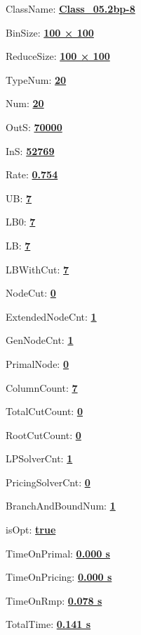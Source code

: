 \documentclass[11pt]{article}
\begin{document}
\pagestyle{empty}


ClassName: \underline{\textbf{Class_05.2bp-8}}
\par
BinSize: \underline{\textbf{100 × 100}}
\par
ReduceSize: \underline{\textbf{100 × 100}}
\par
TypeNum: \underline{\textbf{20}}
\par
Num: \underline{\textbf{20}}
\par
OutS: \underline{\textbf{70000}}
\par
InS: \underline{\textbf{52769}}
\par
Rate: \underline{\textbf{0.754}}
\par
UB: \underline{\textbf{7}}
\par
LB0: \underline{\textbf{7}}
\par
LB: \underline{\textbf{7}}
\par
LBWithCut: \underline{\textbf{7}}
\par
NodeCut: \underline{\textbf{0}}
\par
ExtendedNodeCnt: \underline{\textbf{1}}
\par
GenNodeCnt: \underline{\textbf{1}}
\par
PrimalNode: \underline{\textbf{0}}
\par
ColumnCount: \underline{\textbf{7}}
\par
TotalCutCount: \underline{\textbf{0}}
\par
RootCutCount: \underline{\textbf{0}}
\par
LPSolverCnt: \underline{\textbf{1}}
\par
PricingSolverCnt: \underline{\textbf{0}}
\par
BranchAndBoundNum: \underline{\textbf{1}}
\par
isOpt: \underline{\textbf{true}}
\par
TimeOnPrimal: \underline{\textbf{0.000 s}}
\par
TimeOnPricing: \underline{\textbf{0.000 s}}
\par
TimeOnRmp: \underline{\textbf{0.078 s}}
\par
TotalTime: \underline{\textbf{0.141 s}}
\par
\newpage


\end{document}
